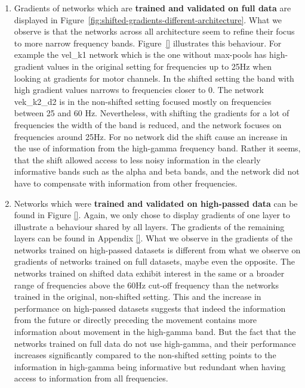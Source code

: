 \begin{enumerate}
    \item Gradients of networks which are \textbf{trained and validated on full data} are displayed in Figure~\ref{fig:shifted-gradients-different-architecture}.
    What we observe is that the networks across all architecture seem to refine their focus to more narrow frequency bands.
    Figure~\ref{} illustrates this behaviour.
    For example the vel\_k1 network which is the one without max-pools has high-gradient values in the original setting for frequencies up to 25Hz when looking at gradients for motor channels.
    In the shifted setting the band with high gradient values narrows to frequencies closer to 0.
    The network vek\_k2\_d2 is in the non-shifted setting focused mostly on frequencies between 25 and 60 Hz. Nevertheless, with shifting the gradients for a lot of frequencies the width of the band is reduced, and the network focuses on frequencies around 25Hz. For no network did the shift cause an increase in the use of information from the high-gamma frequency band.
    Rather it seems, that the shift allowed access to less noisy information in the clearly informative bands such as the alpha and beta bands, and the network did not have to compensate with information from other frequencies.
    \item Networks which were \textbf{trained and validated on high-passed data} can be found in Figure \ref{}.
    Again, we only chose to display gradients of one layer to illustrate a behaviour shared by all layers. The gradients of the remaining layers can be found in Appendix \ref{}.
    What we observe in the gradients of the networks trained on high-passed datasets is different from what we observe on gradients of networks trained on full datasets, maybe even the opposite.
    The networks trained on shifted data exhibit interest in the same or a broader range of frequencies above the 60Hz cut-off frequency than the networks trained in the original, non-shifted setting.
    This and the increase in performance on high-passed datasets suggests that indeed the information from the future or directly preceding the movement contains more information about movement in the high-gamma band.
    But the fact that the networks trained on full data do not use high-gamma, and their performance increases significantly compared to the non-shifted setting points to the information in high-gamma being informative but redundant when having access to information from all frequencies.
\end{enumerate}

